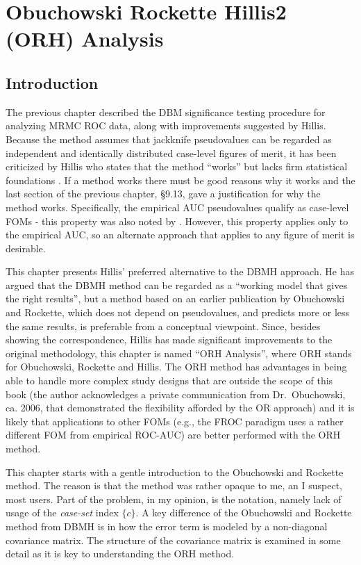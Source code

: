 \documentclass[
]{book}
\begin{document}
\hypertarget{ORHAnalysis}{%
\chapter{Obuchowski Rockette Hillis2 (ORH) Analysis}\label{ORHAnalysis}}

\hypertarget{introduction}{%
\section{Introduction}\label{introduction}}

The previous chapter described the DBM significance testing procedure \citep{RN204} for analyzing MRMC ROC data, along with improvements suggested by Hillis. Because the method assumes that jackknife pseudovalues can be regarded as independent and identically distributed case-level figures of merit, it has been criticized by Hillis who states that the method ``works'' but lacks firm statistical foundations \citep{RN1772, RN1865, RN1866}. If a method works there must be good reasons why it works and the last section of the previous chapter, §9.13, gave a justification for why the method works. Specifically, the empirical AUC pseudovalues qualify as case-level FOMs - this property was also noted by \citep{RN1395}. However, this property applies only to the empirical AUC, so an alternate approach that applies to any figure of merit is desirable.

This chapter presents Hillis' preferred alternative to the DBMH approach. He has argued that the DBMH method can be regarded as a ``working model that gives the right results'', but a method based on an earlier publication \citep{RN1450} by Obuchowski and Rockette, which does not depend on pseudovalues, and predicts more or less the same results, is preferable from a conceptual viewpoint. Since, besides showing the correspondence, Hillis has made significant improvements to the original methodology, this chapter is named ``ORH Analysis'', where ORH stands for Obuchowski, Rockette and Hillis. The ORH method has advantages in being able to handle more complex study designs \citep{RN2508} that are outside the scope of this book (the author acknowledges a private communication from Dr.~Obuchowski, ca. 2006, that demonstrated the flexibility afforded by the OR approach) and it is likely that applications to other FOMs (e.g., the FROC paradigm uses a rather different FOM from empirical ROC-AUC) are better performed with the ORH method.

This chapter starts with a gentle introduction to the Obuchowski and Rockette method. The reason is that the method was rather opaque to me, an I suspect, most users. Part of the problem, in my opinion, is the notation, namely lack of usage of the \emph{case-set} index \(\{c\}\). A key difference of the Obuchowski and Rockette method from DBMH is in how the error term is modeled by a non-diagonal covariance matrix. The structure of the covariance matrix is examined in some detail as it is key to understanding the ORH method.
\end{document}
